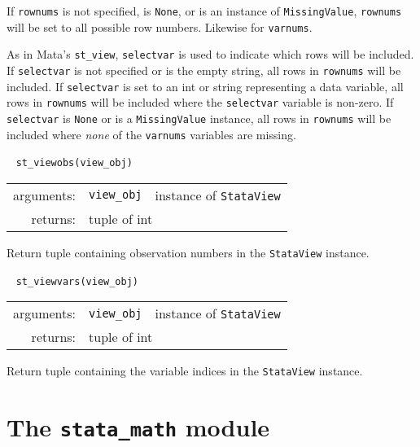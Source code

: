 \documentclass{article}
\begin{document}
			If \lstinline{rownums} is not specified, is \lstinline{None}, or is an instance of \lstinline{MissingValue}, \lstinline{rownums} will be set to all possible row numbers. Likewise for \lstinline{varnums}.
			
			As in Mata's \lstinline{st_view}, \lstinline{selectvar} is used to indicate which rows will be included. If \lstinline{selectvar} is not specified or is the empty string, all rows in \lstinline{rownums} will be included. If \lstinline{selectvar} is set to an int or string representing a data variable, all rows in \lstinline{rownums} will be included where the \lstinline{selectvar} variable is non-zero. If \lstinline{selectvar} is \lstinline{None} or is a \lstinline{MissingValue} instance, all rows in \lstinline{rownums} will be included where \emph{none} of the \lstinline{varnums} variables are missing. \newline
			
			
			\ \newline
			\noindent \lstinline$st_viewobs(view_obj)$
								
			\vspace{1.5mm}
			\noindent 
			\indent \begin{tabular}{rrl}
				arguments: & \texttt{view\_obj} & instance of \lstinline$StataView$ \\
					returns: & \multicolumn{2}{l}{tuple of int}
				\end{tabular}
								
			\vspace{1.5mm}
			\noindent Return tuple containing observation numbers in the \lstinline$StataView$ instance. \newline
			
			
			\ \newline
			\noindent \lstinline$st_viewvars(view_obj)$
								
			\vspace{1.5mm}
			\noindent 
			\indent \begin{tabular}{rrl}
				arguments: & \texttt{view\_obj} & instance of \lstinline$StataView$ \\
					returns: & \multicolumn{2}{l}{tuple of int}
				\end{tabular}
								
			\vspace{1.5mm}
			\noindent Return tuple containing the variable indices in the \lstinline$StataView$ instance. \newline
  
	
\section{The \lstinline$stata_math$ module} \label{stata_math_module}
\end{document}
